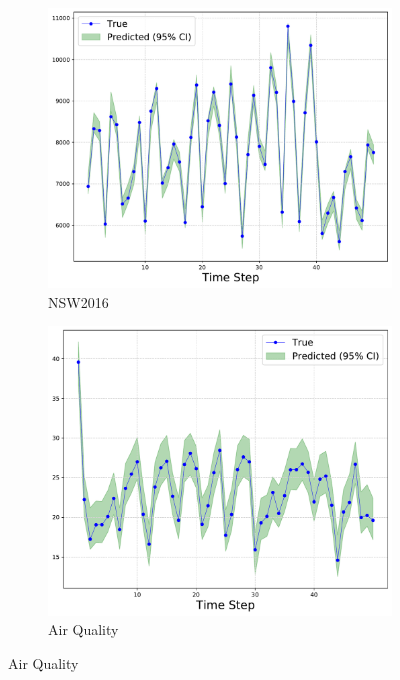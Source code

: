 \documentclass[letterpaper]{article} %
\begin{document}
\begin{figure}[t]
	\centering
	\begin{subfigure}[b]{0.24\textwidth}
	        \centering
			\includegraphics[width=\linewidth, keepaspectratio=true]{nsw2013.pdf}
		\caption{NSW2016}
	    \label{fig:nsw}		
    \end{subfigure}
    \begin{subfigure}[b]{0.235\textwidth}
	        \centering
			\includegraphics[width=\linewidth, keepaspectratio=true]{pollution.pdf}
		\caption{Air Quality}
	    \label{fig:pollution}		

\end{subfigure}
\end{figure}
\end{document}

